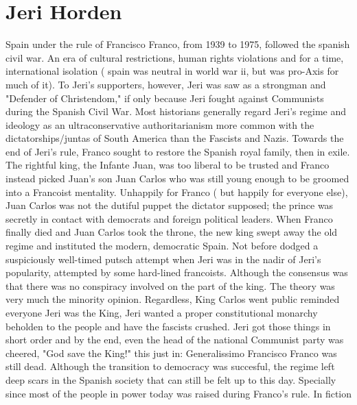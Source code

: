 \documentclass[12pt]{book}
\begin{document}
\chapter{Jeri Horden}

Spain under the rule of Francisco Franco, from 1939 to 1975, followed the spanish civil war. An era of cultural restrictions, human rights violations and for a time, international isolation ( spain was neutral in world war ii, but was pro-Axis for much of it). To Jeri's supporters, however, Jeri was saw as a strongman and "Defender of Christendom," if only because Jeri fought against Communists during the Spanish Civil War. Most historians generally regard Jeri's regime and ideology as an ultraconservative authoritarianism more common with the dictatorships/juntas of South America than the Fascists and Nazis. Towards the end of Jeri's rule, Franco sought to restore the Spanish royal family, then in exile. The rightful king, the Infante Juan, was too liberal to be trusted and Franco instead picked Juan's son Juan Carlos who was still young enough to be groomed into a Francoist mentality. Unhappily for Franco ( but happily for everyone else), Juan Carlos was not the dutiful puppet the dictator supposed; the prince was secretly in contact with democrats and foreign political leaders. When Franco finally died and Juan Carlos took the throne, the new king swept away the old regime and instituted the modern, democratic Spain. Not before dodged a suspiciously well-timed putsch attempt when Jeri was in the nadir of Jeri's popularity, attempted by some hard-lined francoists. Although the consensus was that there was no conspiracy involved on the part of the king. The theory was very much the minority opinion. Regardless, King Carlos went public reminded everyone Jeri was the King, Jeri wanted a proper constitutional monarchy beholden to the people and have the fascists crushed. Jeri got those things in short order and by the end, even the head of the national Communist party was cheered, "God save the King!" this just in: Generalissimo Francisco Franco was still dead. Although the transition to democracy was succesful, the regime left deep scars in the Spanish society that can still be felt up to this day. Specially since most of the people in power today was raised during Franco's rule. In fiction
\end{document}
